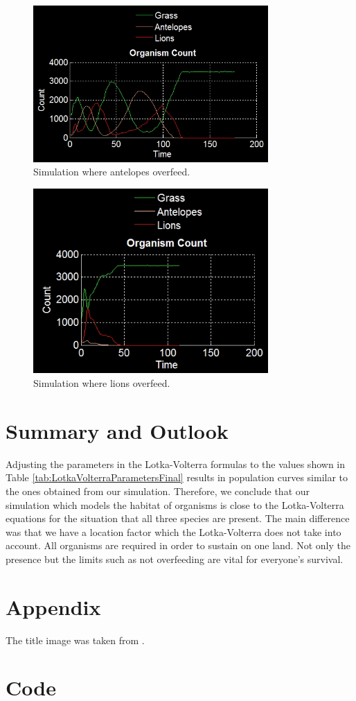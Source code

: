 \documentclass[11pt]{article}
\begin{document}
\begin{figure}
\centering
\includegraphics[width=0.8\textwidth]{AnteOverfeed}
\caption{Simulation where antelopes overfeed.}
\label{fig:anteOverfeed}
\end{figure}
\begin{figure}
\centering
\includegraphics[width=0.8\textwidth]{LionsOverfeed}
\caption{Simulation where lions overfeed.}
\label{fig:lionOverfeed}
\end{figure}

\section{Summary and Outlook}

Adjusting the parameters in the Lotka-Volterra formulas to the values shown in Table \ref{tab:LotkaVolterraParametersFinal} results in  population curves similar to the ones obtained from our simulation. Therefore, we conclude that our simulation which models the habitat of organisms is close to the Lotka-Volterra equations for the situation that all three species are present. The main difference was that we have a location factor which the Lotka-Volterra does not take into account. All organisms are required in order to sustain on one land. Not only the presence but the limits such as not overfeeding are vital for everyone's survival. 
\appendix

\section{Appendix}
The title image was taken from \cite{titleImage}.

\section{Code}



\end{document}
